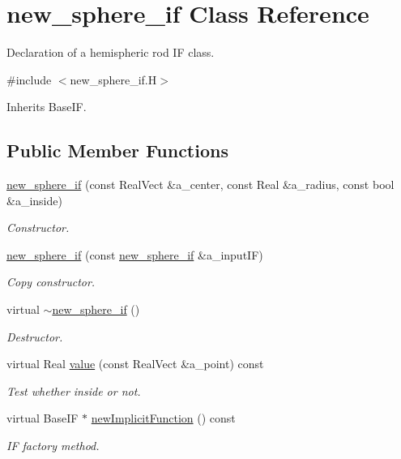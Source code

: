 \hypertarget{classnew__sphere__if}{}\section{new\+\_\+sphere\+\_\+if Class Reference}
\label{classnew__sphere__if}


Declaration of a hemispheric rod IF class.  




{\ttfamily \#include $<$new\+\_\+sphere\+\_\+if.\+H$>$}



Inherits Base\+IF.

\subsection*{Public Member Functions}
\begin{DoxyCompactItemize}
\item 
\hyperlink{classnew__sphere__if_a5e70d278fff7e672c66838e9ebfff01a}{new\+\_\+sphere\+\_\+if} (const Real\+Vect \&a\+\_\+center, const Real \&a\+\_\+radius, const bool \&a\+\_\+inside)
\begin{DoxyCompactList}\small\item\em Constructor. \end{DoxyCompactList}\item 
\hyperlink{classnew__sphere__if_a92707f932fbddd304a6cee2342c53159}{new\+\_\+sphere\+\_\+if} (const \hyperlink{classnew__sphere__if}{new\+\_\+sphere\+\_\+if} \&a\+\_\+input\+IF)
\begin{DoxyCompactList}\small\item\em Copy constructor. \end{DoxyCompactList}\item 
virtual \hyperlink{classnew__sphere__if_af439a8e38a1971d6e1ad0a855fa81849}{$\sim$new\+\_\+sphere\+\_\+if} ()
\begin{DoxyCompactList}\small\item\em Destructor. \end{DoxyCompactList}\item 
virtual Real \hyperlink{classnew__sphere__if_a8c27e560f748d0a99220eb41c328a9fa}{value} (const Real\+Vect \&a\+\_\+point) const 
\begin{DoxyCompactList}\small\item\em Test whether inside or not. \end{DoxyCompactList}\item 
virtual Base\+IF $\ast$ \hyperlink{classnew__sphere__if_a792cab5c148fa313ebbce5fdc63c66d7}{new\+Implicit\+Function} () const 
\begin{DoxyCompactList}\small\item\em IF factory method. \end{DoxyCompactList}\end{DoxyCompactItemize}
